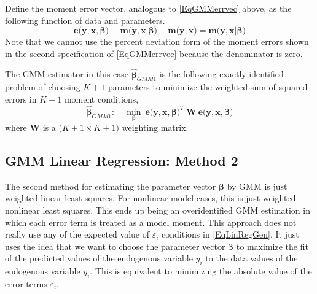 \documentclass[letterpaper,12pt]{article}
\theoremstyle{definition}
\newcommand\ve{\varepsilon}
\begin{document}
    Define the moment error vector, analogous to \eqref{EqGMMerrvec} above, as the following function of data and parameters.
    \begin{equation}\label{EqGMMerrvec1}
      \bm{e}\bigl(\bm{y},\bm{x},\bm{\beta}\bigr)\equiv \bm{m}\bigl(\bm{y},\bm{x}|\bm{\beta}\bigr) - \bm{m}\bigl(\bm{y},\bm{x}\bigr) = \bm{m}\bigl(\bm{y},\bm{x}|\bm{\beta}\bigr)
    \end{equation}
    Note that we cannot use the percent deviation form of the moment errors shown in the second specification of \eqref{EqGMMerrvec} because the denominator is zero.

    The GMM estimator in this case $\bm{\hat{\beta}}_{GMM1}$ is the following exactly identified problem of choosing $K+1$ parameters to minimize the weighted sum of squared errors in $K+1$ moment conditions,
    \begin{equation}\label{EqGMMdef1}
      \bm{\hat{\beta}}_{GMM1}:\quad \min_{\bm{\beta}}\:\bm{e}\bigl(\bm{y},\bm{x},\bm{\beta}\bigr)^T\:\bm{W}\:\bm{e}\bigl(\bm{y},\bm{x},\bm{\beta}\bigr)
    \end{equation}
    where $\bm{W}$ is a $\bigl(K+1\times K+1\bigr)$ weighting matrix.


  \subsection{GMM Linear Regression: Method 2}\label{SecGMM2}

    The second method for estimating the parameter vector $\bm{\beta}$ by GMM is just weighted linear least squares. For nonlinear model cases, this is just weighted nonlinear least squares. This ends up being an overidentified GMM estimation in which each error term is treated as a model moment. This approach does not really use any of the expected value of $\ve_i$ conditions in \eqref{EqLinRegGen}. It just uses the idea that we want to choose the parameter vector $\bm{\beta}$ to maximize the fit of the predicted values of the endogenous variable $\hat{y}_i$ to the data values of the endogenous variable $y_i$. This is equivalent to minimizing the absolute value of the error terms $\ve_i$.
\end{document}
